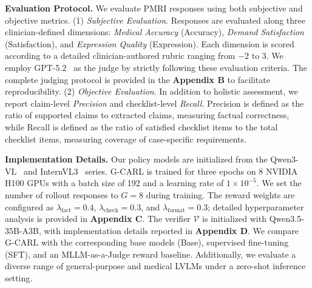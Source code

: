 \documentclass[letterpaper]{article} %
\begin{document}
\vspace{1pt}
\noindent \textbf{Evaluation Protocol.} We evaluate PMRI responses using both subjective and objective metrics. (1) \emph{Subjective Evaluation}.
Responses are evaluated along three clinician-defined dimensions: \emph{Medical Accuracy} (Accuracy), \emph{Demand Satisfaction} (Satisfaction), and \emph{Expression Quality} (Expression). Each dimension is scored according to a detailed clinician-authored rubric ranging from $-2$ to $3$. We employ GPT-5.2~\cite{openai2025gpt52systemcard} as the judge by strictly following these evaluation criteria. 
The complete judging protocol is provided in the \textbf{Appendix B} to facilitate reproducibility.
(2) \emph{Objective Evaluation}.
In addition to holistic assessment, we report claim-level \emph{Precision} and checklist-level \emph{Recall}. Precision is defined as the ratio of supported claims to extracted claims, measuring factual correctness, while Recall is defined as the ratio of satisfied checklist items to the total checklist items, measuring coverage of case-specific requirements. 

\vspace{1pt}
\noindent \textbf{Implementation Details.}
Our policy models are initialized from the Qwen3-VL~\cite{bai2025qwen3vltechnicalreport} and InternVL3~\cite{zhu2025internvl3exploringadvancedtraining} series. G-CARL is trained for three epochs on 8 NVIDIA H100 GPUs with a batch size of 192 and a learning rate of $1\times10^{-5}$. 
We set the number of rollout responses to $G=8$ during training. 
The reward weights are configured as $\lambda_{\text{fact}}=0.4$, $\lambda_{\text{check}}=0.3$, and $\lambda_{\text{format}}=0.3$; detailed hyperparameter analysis is provided in \textbf{Appendix C}. 
The verifier $\mathcal{V}$ is initialized with Qwen3.5-35B-A3B, with implementation details reported in \textbf{Appendix D}. 
We compare G-CARL with the corresponding base models (Base), supervised fine-tuning (SFT), and an MLLM-as-a-Judge reward baseline. 
Additionally, we evaluate a diverse range of general-purpose and medical LVLMs under a zero-shot inference setting.
\end{document}
